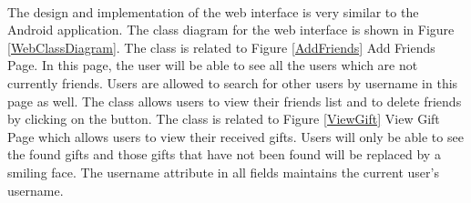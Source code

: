 \paragraph{} The design and implementation of the web interface is very similar to the Android application. The class diagram for the web interface is shown in Figure \ref{WebClassDiagram}. The  class is related to Figure \ref{AddFriends} Add Friends Page. In this page, the user will be able to see all the users which are not currently friends. Users are allowed to search for other users by username in this page as well. The  class allows users to view their friends list and to delete friends by clicking on the  button. The  class is related to Figure \ref{ViewGift} View Gift Page which allows users to view their received gifts. Users will only be able to see the found gifts and those gifts that have not been found will be replaced by a smiling face. The username attribute in all fields maintains the current user's username. 
